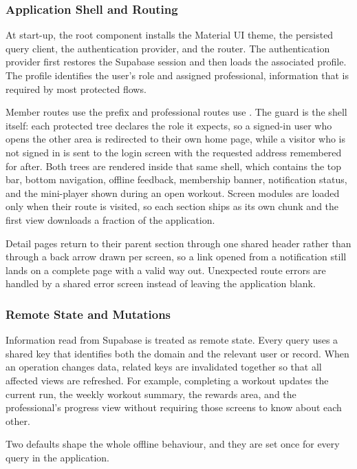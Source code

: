 \subsubsection{Application Shell and Routing}\label{subsubsect:ApplicationShellRouting}

At start-up, the root component installs the Material UI theme, the persisted query client, the authentication provider, and the router. The authentication provider first restores the Supabase session and then loads the associated profile. The profile identifies the user's role and assigned professional, information that is required by most protected flows.

Member routes use the  prefix and professional routes use . The guard is the shell itself: each protected tree declares the role it expects, so a signed-in user who opens the other area is redirected to their own home page, while a visitor who is not signed in is sent to the login screen with the requested address remembered for after. Both trees are rendered inside that same shell, which contains the top bar, bottom navigation, offline feedback, membership banner, notification status, and the mini-player shown during an open workout. Screen modules are loaded only when their route is visited, so each section ships as its own chunk and the first view downloads a fraction of the application.

Detail pages return to their parent section through one shared header rather than through a back arrow drawn per screen, so a link opened from a notification still lands on a complete page with a valid way out. Unexpected route errors are handled by a shared error screen instead of leaving the application blank.

\subsubsection{Remote State and Mutations}\label{subsubsect:RemoteStateMutations}

Information read from Supabase is treated as remote state. Every query uses a shared key that identifies both the domain and the relevant user or record. When an operation changes data, related keys are invalidated together so that all affected views are refreshed. For example, completing a workout updates the current run, the weekly workout summary, the rewards area, and the professional's progress view without requiring those screens to know about each other.

Two defaults shape the whole offline behaviour, and they are set once for every query in the application.

